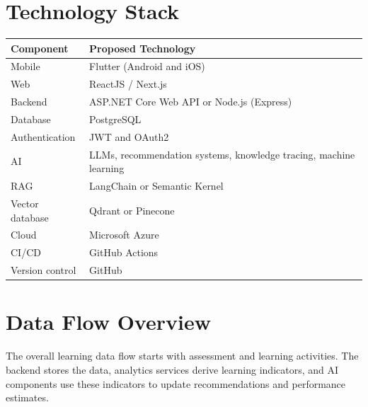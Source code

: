 \section{Technology Stack}

\begin{longtable}{p{}p{}}
\toprule
\textbf{Component} & \textbf{Proposed Technology}\\
\midrule
Mobile & Flutter (Android and iOS)\\
Web & ReactJS / Next.js\\
Backend & ASP.NET Core Web API or Node.js (Express)\\
Database & PostgreSQL\\
Authentication & JWT and OAuth2\\
AI & LLMs, recommendation systems, knowledge tracing, machine learning\\
RAG & LangChain or Semantic Kernel\\
Vector database & Qdrant or Pinecone\\
Cloud & Microsoft Azure\\
CI/CD & GitHub Actions\\
Version control & GitHub\\
\bottomrule
\end{longtable}

\section{Data Flow Overview}

The overall learning data flow starts with assessment and learning activities. The backend stores the data, analytics services derive learning indicators, and AI components use these indicators to update recommendations and performance estimates.


